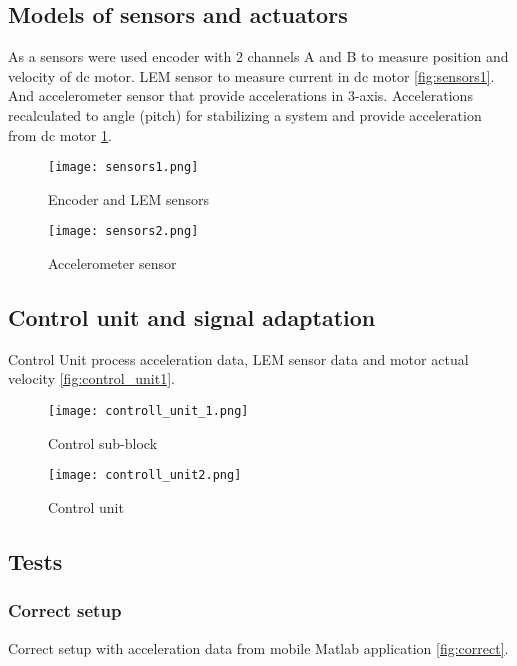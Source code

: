 \documentclass[../report.tex]{subfiles}
\begin{document}
\subsection{Models of sensors and actuators}
As a sensors were used encoder with 2 channels A and B to measure position
and velocity of dc motor. LEM sensor to measure current in dc motor
\ref{fig:sensors1}. And accelerometer sensor that provide accelerations in
3-axis. Accelerations recalculated to angle (pitch) for stabilizing a
system and provide acceleration from dc motor \ref{fig:sensors2}.
\begin{figure}[hbt!]
    \centering
    \begin{minipage}{.5\textwidth}
    \centering
    \texttt{[image: sensors1.png]}
    \caption{Encoder and LEM sensors}
    \label{fig:sensors1}
\end{minipage}%
\begin{minipage}{.5\textwidth}
    \centering
    \texttt{[image: sensors2.png]}
    \caption{Accelerometer sensor}
    \label{fig:sensors2}
\end{minipage}
\end{figure}

\subsection{Control unit and signal adaptation}
Control Unit process acceleration data, LEM sensor data and motor actual
velocity \ref{fig:control_unit1}.

\begin{figure}[hbt!]
    \centering
    \begin{minipage}{.5\textwidth}
    \centering
    \texttt{[image: controll\_unit\_1.png]}
\caption{Control sub-block}
\label{fig:control_unit1}
\end{minipage}%
\begin{minipage}{.5\textwidth}
    \centering
    \texttt{[image: controll\_unit2.png]}
    \caption{Control unit}
    \label{fig:control_unit2}
\end{minipage}
\end{figure}

\subsection{Tests}

\subsubsection{Correct setup}
Correct setup with acceleration data from mobile Matlab application
\ref{fig:correct}.
\end{document}
